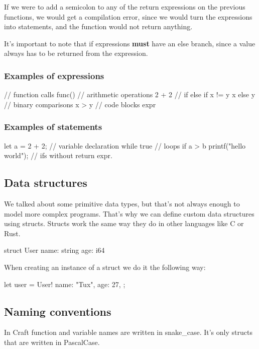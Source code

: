 ﻿\documentclass[10pt,a4paper,twocolumn,twoside]{article}
\begin{document}
If we were to add a semicolon to any of the return expressions on the previous
functions, we would get a compilation error, since we would turn the expressions
into statements, and the function would not return anything.

It's important to note that if expressions \textbf{must} have an else branch,
since a value always has to be returned from the expression.

\subsubsection{Examples of expressions}
\begin{code}
// function calls
func()
// arithmetic operations
2 + 2 
// if else
if x != y { x } else { y }
// binary comparisons
x > y 
// code blocks
{ expr }
\end{code}

\subsubsection{Examples of statements}
\begin{code}
let a = 2 + 2;  // variable declaration
while true {  } // loops
if a > b { printf("hello world"); } // ifs without return expr.
\end{code}

\subsection{Data structures}
We talked about some primitive data types, but that's not always enough to model
more complex programs. That's why we can define custom data structures using 
structs. Structs work the same way they do in other languages like C or Rust.

\begin{code}
struct User {
    name: string
    age: i64
}
\end{code}

When creating an instance of a struct we do it the following way:

\begin{code}
    let user = User!{
        name: "Tux",
        age: 27,
    };
\end{code}

\subsection{Naming conventions}
In Craft function and variable names are written in snake\_case. It's 
only structs that are written in PascalCase.
\end{document}
